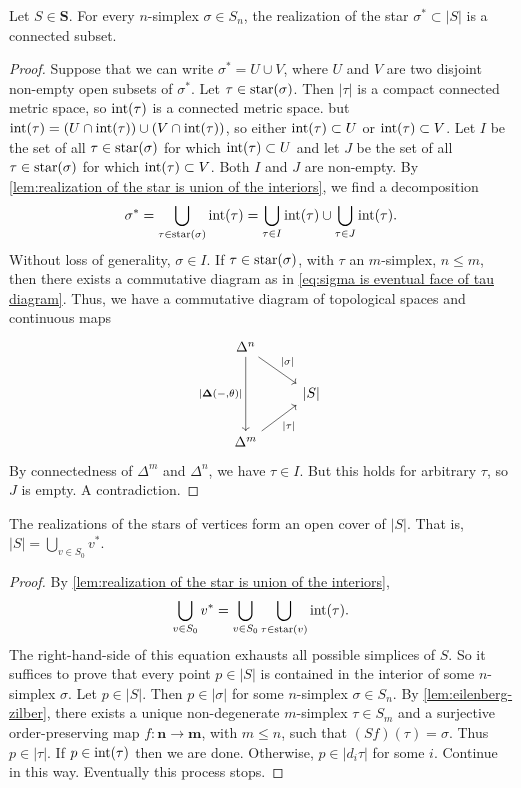 \begin{lemma}
\label{lem:realization of the star is connected}
Let $S \in \mathbf{S}$. For every $n$-simplex $\sigma \in S_n$, the realization of the star $\sigma^* \subset |S|$ is a connected subset.
\end{lemma}
\begin{proof}
Suppose that we can write $\sigma^* = U \cup V$, where $U$ and $V$ are two disjoint non-empty open subsets of $\sigma^*$. Let $\tau \in \operatorname{star}(\sigma)$. Then $|\tau|$ is a compact connected metric space, so $\operatorname{int}(\tau)$ is a connected metric space. but $\operatorname{int}(\tau) = \left(U \cap \operatorname{int}(\tau) \right) \cup \left(V \cap \operatorname{int}(\tau) \right)$, so either $\operatorname{int}(\tau) \subset U$ or $\operatorname{int}(\tau) \subset V$. Let $I$ be the set of all $\tau \in \operatorname{star}(\sigma)$ for which $\operatorname{int}(\tau) \subset U$ and let $J$ be the set of all $\tau \in \operatorname{star}(\sigma)$ for which $\operatorname{int}(\tau) \subset V$. Both $I$ and $J$ are non-empty. By \cref{lem:realization of the star is union of the interiors}, we find a decomposition
\[ \sigma^* = \bigcup_{\tau \in \operatorname{star}(\sigma)} \operatorname{int}(\tau) = \bigcup_{\tau \in I} \operatorname{int}(\tau) \cup \bigcup_{\tau \in J} \operatorname{int}(\tau). \]
Without loss of generality, $\sigma \in I$. If $\tau \in \operatorname{star}(\sigma)$, with $\tau$ an $m$-simplex, $n \leq m$, then there exists a commutative diagram as in \cref{eq:sigma is eventual face of tau diagram}. Thus, we have a commutative diagram of topological spaces and continuous maps
\[ \begin{tikzcd}
\Delta^n \arrow{dr}{|\sigma|} \arrow[swap]{dd}{|\mathbf{\Delta}(-,\theta)|} & \\
& \left| S \right| \\
\Delta^m \arrow[swap]{ur}{|\tau|}
\end{tikzcd} \]
By connectedness of $\Delta^m$ and $\Delta^n$, we have $\tau \in I$. But this holds for arbitrary $\tau$, so $J$ is empty. A contradiction.
\end{proof}

\begin{lemma}
\label{lem:realizations of stars form an open cover}
The realizations of the stars of vertices form an open cover of $|S|$. That is, $|S| = \bigcup_{v \in S_0} v^*$.
\end{lemma}
\begin{proof}
By \cref{lem:realization of the star is union of the interiors},
\[ \bigcup_{v \in S_0}v^* = \bigcup_{v \in S_0} \bigcup_{\tau \in \operatorname{star}(v)} \operatorname{int}(\tau). \]
The right-hand-side of this equation exhausts all possible simplices of $S$. So it suffices to prove that every point $p \in |S|$ is contained in the interior of some $n$-simplex $\sigma$.
Let $p \in |S|$. Then $p \in |\sigma|$ for some $n$-simplex $\sigma \in S_n$. By \cref{lem:eilenberg-zilber}, there exists a unique non-degenerate $m$-simplex $\tau \in S_m$ and a surjective order-preserving map $f : \mathbf{n} \to \mathbf{m}$, with $m \leq n$, such that $(Sf)(\tau) = \sigma$. Thus $p \in |\tau|$. If $p \in \operatorname{int}(\tau)$ then we are done. Otherwise, $p \in |d_i \tau|$ for some $i$. Continue in this way. Eventually this process stops.
\end{proof}

